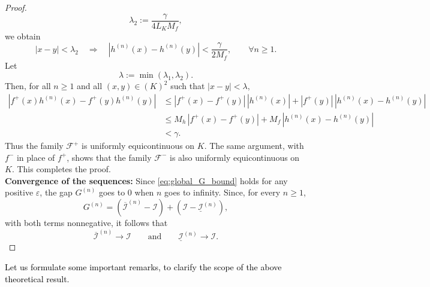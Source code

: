 \documentclass[review]{elsarticle}
\newcommand{\cblue}{\textcolor{black}}
\begin{document}
{\begin{proof}
\begin{equation}
\lambda_2:=\frac{\gamma}{4L_KM_f},
\end{equation}
we obtain
\begin{equation}
|x-y|<\lambda_2
\quad\Longrightarrow\quad
|h^{(n)}(x)-h^{(n)}(y)|<\frac{\gamma}{2M_f},
\qquad \forall n\ge 1.
\end{equation}
Let
\begin{equation}
\lambda:=\min(\lambda_1,\lambda_2).
\end{equation}
Then, for all $n\ge 1$ and all $(x,y)\in (K)^2$ such that $|x-y|<\lambda$,
\begin{equation}
\begin{aligned}
|f^+(x)h^{(n)}(x)-f^+(y)h^{(n)}(y)|
&\le |f^+(x)-f^+(y)|\,|h^{(n)}(x)| + |f^+(y)|\,|h^{(n)}(x)-h^{(n)}(y)| \\
&\le M_h\,|f^+(x)-f^+(y)| + M_f\,|h^{(n)}(x)-h^{(n)}(y)| \\
&< \gamma.
\end{aligned}
\end{equation}
Thus the family $\mathcal F^+$ is uniformly equicontinuous on $K$. The same argument, with $f^-$ in place of $f^+$, shows that the family $\mathcal F^-$ is also uniformly equicontinuous on $K$. This completes the proof.\\
\textbf{Convergence of the sequences:} Since \eqref{eq:global_G_bound} holds for any positive $\varepsilon$, the gap $G^{(n)}$ goes to $0$ when $n$ goes to infinity. Since, for every $n \geq 1$,
$$
G^{(n)}
=
\left(\overline{\mathcal{I}}^{(n)}-\mathcal{I}\right)
+
\left(\mathcal{I}-\underline{\mathcal{I}}^{(n)}\right),
$$
with both terms nonnegative, it follows that
$$
\overline{\mathcal{I}}^{(n)}\to \mathcal{I}
\qquad\text{and}\qquad
\underline{\mathcal{I}}^{(n)}\to \mathcal{I}.
$$
\end{proof}
}

\cblue{Let us formulate some important remarks, to clarify the scope of the above theoretical result.}
\end{document}
